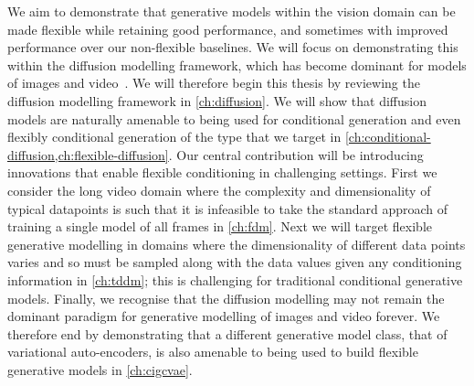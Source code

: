 We aim to demonstrate that generative models within the vision domain can be made flexible while retaining good performance, and sometimes with improved performance over our non-flexible baselines. We will focus on demonstrating this within the diffusion modelling framework, which has become dominant for models of images and video~\citep{sohl2015deep,ho2020denoising,dhariwal2021diffusion,rombach2022high,ho2022imagen,peebles2022scalable,brooks2024video}. We will therefore begin this thesis by reviewing the diffusion modelling framework in \cref{ch:diffusion}. We will show that diffusion models are naturally amenable to being used for conditional generation and even flexibly conditional generation of the type that we target in \cref{ch:conditional-diffusion,ch:flexible-diffusion}. Our central contribution will be introducing innovations that enable flexible conditioning in challenging settings. First we consider the long video domain where the complexity and dimensionality of typical datapoints is such that it is infeasible to take the standard approach of training a single model of all frames in \cref{ch:fdm}. Next we will target flexible generative modelling in domains where the dimensionality of different data points varies and so must be sampled along with the data values given any conditioning information in \cref{ch:tddm}; this is challenging for traditional conditional generative models. Finally, we recognise that the diffusion modelling may not remain the dominant paradigm for generative modelling of images and video forever. We therefore end by demonstrating that a different generative model class, that of variational auto-encoders, is also amenable to being used to build flexible generative models in \cref{ch:cigcvae}.
